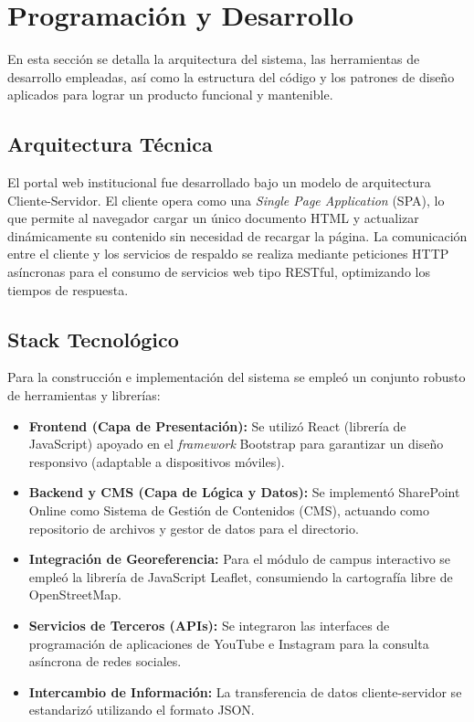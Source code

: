 \section{Programación y Desarrollo}
\label{sec:desarrollo}

En esta sección se detalla la arquitectura del sistema, las herramientas de desarrollo empleadas, así como la estructura del código y los patrones de diseño aplicados para lograr un producto funcional y mantenible.


\subsection{Arquitectura Técnica}
El portal web institucional fue desarrollado bajo un modelo de arquitectura Cliente-Servidor. El cliente opera como una \textit{Single Page Application} (SPA), lo que permite al navegador cargar un único documento HTML y actualizar dinámicamente su contenido sin necesidad de recargar la página. La comunicación entre el cliente y los servicios de respaldo se realiza mediante peticiones HTTP asíncronas para el consumo de servicios web tipo RESTful, optimizando los tiempos de respuesta.

\subsection{Stack Tecnológico}
Para la construcción e implementación del sistema se empleó un conjunto robusto de herramientas y librerías:
\begin{itemize}
    \item \textbf{Frontend (Capa de Presentación):} Se utilizó React (librería de JavaScript) apoyado en el \textit{framework} Bootstrap para garantizar un diseño responsivo (adaptable a dispositivos móviles).
    \item \textbf{Backend y CMS (Capa de Lógica y Datos):} Se implementó SharePoint Online como Sistema de Gestión de Contenidos (CMS), actuando como repositorio de archivos y gestor de datos para el directorio.
    \item \textbf{Integración de Georeferencia:} Para el módulo de campus interactivo se empleó la librería de JavaScript Leaflet, consumiendo la cartografía libre de OpenStreetMap.
    \item \textbf{Servicios de Terceros (APIs):} Se integraron las interfaces de programación de aplicaciones de YouTube e Instagram para la consulta asíncrona de redes sociales.
    \item \textbf{Intercambio de Información:} La transferencia de datos cliente-servidor se estandarizó utilizando el formato JSON.
\end{itemize}

